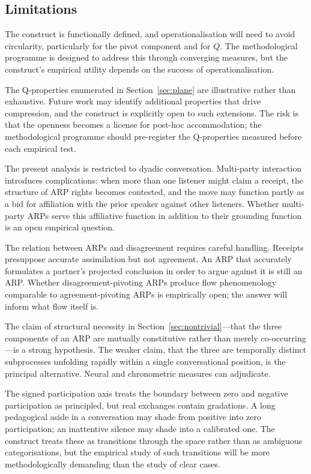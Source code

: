 \subsection{Limitations}

The construct is functionally defined, and operationalisation will need to avoid circularity, particularly for the pivot component and for $Q$. The methodological programme is designed to address this through converging measures, but the construct's empirical utility depends on the success of operationalisation.

The Q-properties enumerated in Section~\ref{sec:plane} are illustrative rather than exhaustive. Future work may identify additional properties that drive compression, and the construct is explicitly open to such extensions. The risk is that the openness becomes a license for post-hoc accommodation; the methodological programme should pre-register the Q-properties measured before each empirical test.

The present analysis is restricted to dyadic conversation. Multi-party interaction introduces complications: when more than one listener might claim a receipt, the structure of ARP rights becomes contested, and the move may function partly as a bid for affiliation with the prior speaker against other listeners. Whether multi-party ARPs serve this affiliative function in addition to their grounding function is an open empirical question.

The relation between ARPs and disagreement requires careful handling. Receipts presuppose accurate assimilation but not agreement. An ARP that accurately formulates a partner's projected conclusion in order to argue against it is still an ARP. Whether disagreement-pivoting ARPs produce flow phenomenology comparable to agreement-pivoting ARPs is empirically open; the answer will inform what flow itself is.

The claim of structural necessity in Section~\ref{sec:nontrivial}---that the three components of an ARP are mutually constitutive rather than merely co-occurring---is a strong hypothesis. The weaker claim, that the three are temporally distinct subprocesses unfolding rapidly within a single conversational position, is the principal alternative. Neural and chronometric measures can adjudicate.

The signed participation axis treats the boundary between zero and negative participation as principled, but real exchanges contain gradations. A long pedagogical aside in a conversation may shade from positive into zero participation; an inattentive silence may shade into a calibrated one. The construct treats these as transitions through the space rather than as ambiguous categorisations, but the empirical study of such transitions will be more methodologically demanding than the study of clear cases.

